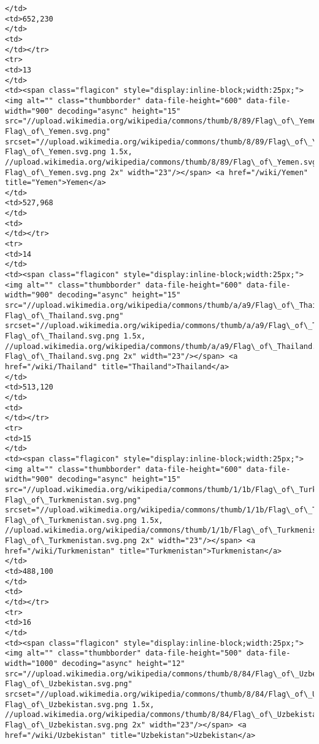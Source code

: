 \documentclass[11pt]{article}
\begin{document}
\begin{Verbatim}[commandchars=\\\{\}]
</td>
<td>652,230
</td>
<td>
</td></tr>
<tr>
<td>13
</td>
<td><span class="flagicon" style="display:inline-block;width:25px;"><img alt="" class="thumbborder" data-file-height="600" data-file-width="900" decoding="async" height="15" src="//upload.wikimedia.org/wikipedia/commons/thumb/8/89/Flag\_of\_Yemen.svg/23px-Flag\_of\_Yemen.svg.png" srcset="//upload.wikimedia.org/wikipedia/commons/thumb/8/89/Flag\_of\_Yemen.svg/35px-Flag\_of\_Yemen.svg.png 1.5x, //upload.wikimedia.org/wikipedia/commons/thumb/8/89/Flag\_of\_Yemen.svg/45px-Flag\_of\_Yemen.svg.png 2x" width="23"/></span> <a href="/wiki/Yemen" title="Yemen">Yemen</a>
</td>
<td>527,968
</td>
<td>
</td></tr>
<tr>
<td>14
</td>
<td><span class="flagicon" style="display:inline-block;width:25px;"><img alt="" class="thumbborder" data-file-height="600" data-file-width="900" decoding="async" height="15" src="//upload.wikimedia.org/wikipedia/commons/thumb/a/a9/Flag\_of\_Thailand.svg/23px-Flag\_of\_Thailand.svg.png" srcset="//upload.wikimedia.org/wikipedia/commons/thumb/a/a9/Flag\_of\_Thailand.svg/35px-Flag\_of\_Thailand.svg.png 1.5x, //upload.wikimedia.org/wikipedia/commons/thumb/a/a9/Flag\_of\_Thailand.svg/45px-Flag\_of\_Thailand.svg.png 2x" width="23"/></span> <a href="/wiki/Thailand" title="Thailand">Thailand</a>
</td>
<td>513,120
</td>
<td>
</td></tr>
<tr>
<td>15
</td>
<td><span class="flagicon" style="display:inline-block;width:25px;"><img alt="" class="thumbborder" data-file-height="600" data-file-width="900" decoding="async" height="15" src="//upload.wikimedia.org/wikipedia/commons/thumb/1/1b/Flag\_of\_Turkmenistan.svg/23px-Flag\_of\_Turkmenistan.svg.png" srcset="//upload.wikimedia.org/wikipedia/commons/thumb/1/1b/Flag\_of\_Turkmenistan.svg/35px-Flag\_of\_Turkmenistan.svg.png 1.5x, //upload.wikimedia.org/wikipedia/commons/thumb/1/1b/Flag\_of\_Turkmenistan.svg/45px-Flag\_of\_Turkmenistan.svg.png 2x" width="23"/></span> <a href="/wiki/Turkmenistan" title="Turkmenistan">Turkmenistan</a>
</td>
<td>488,100
</td>
<td>
</td></tr>
<tr>
<td>16
</td>
<td><span class="flagicon" style="display:inline-block;width:25px;"><img alt="" class="thumbborder" data-file-height="500" data-file-width="1000" decoding="async" height="12" src="//upload.wikimedia.org/wikipedia/commons/thumb/8/84/Flag\_of\_Uzbekistan.svg/23px-Flag\_of\_Uzbekistan.svg.png" srcset="//upload.wikimedia.org/wikipedia/commons/thumb/8/84/Flag\_of\_Uzbekistan.svg/35px-Flag\_of\_Uzbekistan.svg.png 1.5x, //upload.wikimedia.org/wikipedia/commons/thumb/8/84/Flag\_of\_Uzbekistan.svg/46px-Flag\_of\_Uzbekistan.svg.png 2x" width="23"/></span> <a href="/wiki/Uzbekistan" title="Uzbekistan">Uzbekistan</a>

\end{Verbatim}
\end{document}
